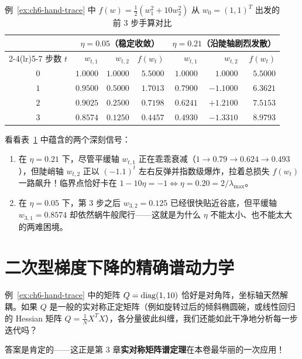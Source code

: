 \begin{table}[htbp]
\centering
\caption{例~\ref{ex:ch6-hand-trace} 中 $f(w)=\frac{1}{2}(w_1^2+10w_2^2)$ 从 $w_0=(1,1)^T$ 出发的前 3 步手算对比}
\label{tab:ch6-hand-trace}
\small
\begin{tabular}{@{}crrrrrr@{}}
\toprule
& \multicolumn{3}{c}{$\eta = 0.05$（稳定收敛）} & \multicolumn{3}{c}{$\eta = 0.21$（沿陡轴剧烈发散）} \\
\cmidrule(lr){2-4}\cmidrule(lr){5-7}
步数 $t$ & $w_{t,1}$ & $w_{t,2}$ & $f(w_t)$ & $w_{t,1}$ & $w_{t,2}$ & $f(w_t)$ \\
\midrule
$0$ & $1.0000$ & $1.0000$ & $5.5000$ & $1.0000$ & $1.0000$ & $5.5000$ \\
$1$ & $0.9500$ & $0.5000$ & $1.7013$ & $0.7900$ & $-1.1000$ & $6.3621$ \\
$2$ & $0.9025$ & $0.2500$ & $0.7198$ & $0.6241$ & $+1.2100$ & $7.5153$ \\
$3$ & $0.8574$ & $0.1250$ & $0.4457$ & $0.4930$ & $-1.3310$ & $8.9793$ \\
\bottomrule
\end{tabular}
\end{table}

看看表~\ref{tab:ch6-hand-trace} 中蕴含的两个深刻信号：
\begin{enumerate}
  \item 在 $\eta = 0.21$ 下，尽管平缓轴 $w_{t,1}$ 正在乖乖衰减（$1 \to 0.79 \to 0.624 \to 0.493$），但陡峭轴 $w_{t,2}$ 正以 $(-1.1)^t$ 左右反弹并指数级爆炸，拉着总损失 $f(w_t)$ 一路飙升！临界点恰好卡在 $1 - 10\eta = -1 \iff \eta = 0.20 = 2/\lambda_{\max}$。
  \item 在 $\eta = 0.05$ 下，第 3 步之后 $w_{3,2} = 0.125$ 已经很快贴近谷底，但平缓轴 $w_{3,1} = 0.8574$ 却依然蜗牛般爬行——这就是为什么 $\eta$ 不能太小、也不能太大的两难困境。
\end{enumerate}

\section{二次型梯度下降的精确谱动力学}
\label{sec:ch6-spectral-gd}

例~\ref{ex:ch6-hand-trace} 中的矩阵 $Q = \operatorname{diag}(1, 10)$ 恰好是对角阵，坐标轴天然解耦。如果 $Q$ 是一般的实对称正定矩阵（例如旋转过后的倾斜椭圆碗，或线性回归的 Hessian 矩阵 $Q = \frac{1}{N}X^T X$），各分量彼此纠缠，我们还能如此干净地分析每一步迭代吗？

答案是肯定的——这正是第 3 章\textbf{实对称矩阵谱定理}在本卷最华丽的一次应用！

